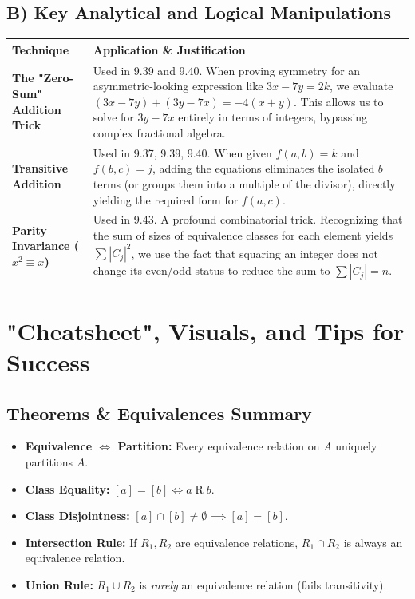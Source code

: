 \documentclass[11pt, a4paper]{article}
\theoremstyle{definition}
\theoremstyle{remark}
\begin{document}
\subsection{B) Key Analytical and Logical Manipulations}
\renewcommand{\arraystretch}{1.5}
\noindent
\begin{tabularx}{\textwidth}{l X}
\toprule
\textbf{Technique} & \textbf{Application \& Justification} \\
\midrule
\textbf{The "Zero-Sum" Addition Trick} & Used in 9.39 and 9.40. When proving symmetry for an asymmetric-looking expression like $3x - 7y = 2k$, we evaluate $(3x - 7y) + (3y - 7x) = -4(x+y)$. This allows us to solve for $3y - 7x$ entirely in terms of integers, bypassing complex fractional algebra. \\
\addlinespace[4pt]
\textbf{Transitive Addition} & Used in 9.37, 9.39, 9.40. When given $f(a,b) = k$ and $f(b,c) = j$, adding the equations eliminates the isolated $b$ terms (or groups them into a multiple of the divisor), directly yielding the required form for $f(a,c)$. \\
\addlinespace[4pt]
\textbf{Parity Invariance ($x^2 \equiv x$)} & Used in 9.43. A profound combinatorial trick. Recognizing that the sum of sizes of equivalence classes for each element yields $\sum |C_j|^2$, we use the fact that squaring an integer does not change its even/odd status to reduce the sum to $\sum |C_j| = n$. \\
\bottomrule
\end{tabularx}

\newpage
\section{"Cheatsheet", Visuals, and Tips for Success}

\subsection{Theorems \& Equivalences Summary}
\begin{itemize}
    \item \textbf{Equivalence $\iff$ Partition:} Every equivalence relation on $A$ uniquely partitions $A$.
    \item \textbf{Class Equality:} $[a] = [b] \iff a \mathrel{R} b$.
    \item \textbf{Class Disjointness:} $[a] \cap [b] \neq \emptyset \implies [a] = [b]$.
    \item \textbf{Intersection Rule:} If $R_1, R_2$ are equivalence relations, $R_1 \cap R_2$ is always an equivalence relation.
    \item \textbf{Union Rule:} $R_1 \cup R_2$ is \textit{rarely} an equivalence relation (fails transitivity).
\end{itemize}
\end{document}
